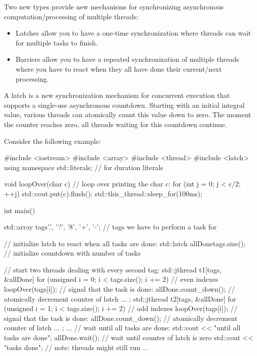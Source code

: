
Two new types provide new mechanisms for synchronizing asynchronous computation/processing of multiple threads:

\begin{itemize}
\item 
Latches allow you to have a one-time synchronization where threads can wait for multiple tasks to finish.

\item 
Barriers allow you to have a repeated synchronization of multiple threads where you have to react when they all have done their current/next processing.
\end{itemize}


A latch is a new synchronization mechanism for concurrent execution that supports a single-use asynchronous countdown. Starting with an initial integral value, various threads can atomically count this value down to zero. The moment the counter reaches zero, all threads waiting for this countdown continue.

Consider the following example:


\begin{cpp}
#include <iostream>
#include <array>
#include <thread>
#include <latch>
using namespace std::literals; // for duration literals

void loopOver(char c) {
	// loop over printing the char c:
	for (int j = 0; j < c/2; ++j) {
		std::cout.put(c).flush();
		std::this_thread::sleep_for(100ms);
	}
}

int main()
{
	std::array tags{'.', '?', '8', '+', '-'}; // tags we have to perform a task for
	
	// initialize latch to react when all tasks are done:
	std::latch allDone{tags.size()}; // initialize countdown with number of tasks
	
	// start two threads dealing with every second tag:
	std::jthread t1{[tags, &allDone] {
			for (unsigned i = 0; i < tags.size(); i += 2) { // even indexes
				loopOver(tags[i]);
				// signal that the task is done:
				allDone.count_down(); // atomically decrement counter of latch
			}
			...
	}};
	std::jthread t2{[tags, &allDone] {
			for (unsigned i = 1; i < tags.size(); i += 2) { // odd indexes
				loopOver(tags[i]);
				// signal that the task is done:
				allDone.count_down(); // atomically decrement counter of latch
			}
			...
	}};
	...
	// wait until all tasks are done:
	std::cout << "\nwaiting until all tasks are done\n";
	allDone.wait(); // wait until counter of latch is zero
	std::cout << "\nall tasks done\n"; // note: threads might still run
	...
}
\end{cpp}


